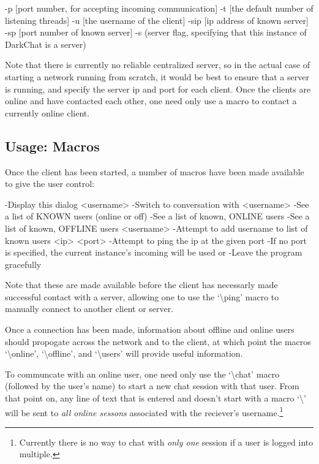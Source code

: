 \documentclass[11pt]{article}
\begin{document}
\begin{code}
-p [port number, for accepting incoming communication]
-t [the default number of listening threads]
-u [the username of the client]
-sip [ip address of known server]
-sp [port number of known server]
-s (server flag, specifying that this instance of DarkChat is a server)
\end{code}

Note that there is currently no reliable centralized server, so in the actual case of starting a network running from scratch, it would be best to ensure that a server is running, and specify the server ip and port for each client. Once the clients are online and have contacted each other, one need only use a macro to contact a currently online client.

\subsection{Usage: Macros}

Once the client has been started, a number of macros have been made available to give the user control:

\begin{code}
  \help
   -Display this dialog
  \chat <username>
   -Switch to conversation with <username>
  \users
   -See a list of KNOWN users (online or off)
  \online
   -See a list of known, ONLINE users
  \offline
   -See a list of known, OFFLINE users
  \add <username>
   -Attempt to add username to list of known users
  \ping <ip> <port>
  -Attempt to ping the ip at the given port
  -If no port is specified, the current instance's incoming will be used
  \quit or \exit
   -Leave the program gracefully
\end{code}

Note that these are made available before the client has necessarly made successful contact with a server, allowing one to use the `\textbackslash ping' macro to manually connect to another client or server.

Once a connection has been made, information about offline and online users should propogate across the network and to the client, at which point the macros `\textbackslash online', `\textbackslash offline', and `\textbackslash users' will provide useful information.

To communcate with an online user, one need only use the `\textbackslash chat' macro (followed by the user's name) to start a new chat session with that user. From that point on, any line of text that is entered and doesn't start with a macro `\textbackslash' will be sent to \emph{all online sessons} associated with the reciever's username.\footnote{Currently there is no way to chat with \emph{only one} session if a user is logged into multiple.}
\end{document}
